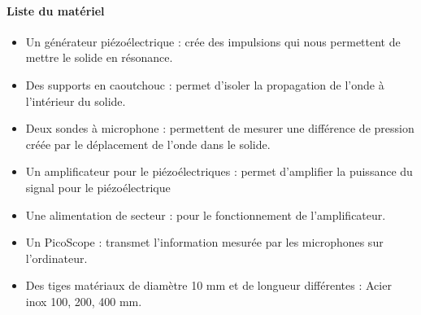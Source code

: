 \newpage


\paragraph{Liste du matériel}
\begin{itemize}
    \item Un générateur piézoélectrique :
    \subitem crée des impulsions qui nous permettent de
    mettre le solide en résonance.\\
    \item Des supports en caoutchouc :
    \subitem permet d'isoler la propagation de l'onde à l'intérieur 
    du solide.\\
    \item Deux sondes à microphone :
    \subitem permettent de mesurer une différence de pression
    créée par le déplacement de l'onde dans le solide.\\
    \item Un amplificateur pour le piézoélectriques :
    \subitem permet d'amplifier la puissance du signal pour le piézoélectrique\\
    \item Une alimentation de secteur :
    \subitem pour le fonctionnement de l'amplificateur.\\
    \item Un PicoScope :
    \subitem transmet l'information mesurée par les microphones
    sur l'ordinateur.\\
    \item Des tiges matériaux de diamètre 10 mm et de longueur différentes :
    \subitem Acier inox 100, 200, 400 mm.
\end{itemize}
